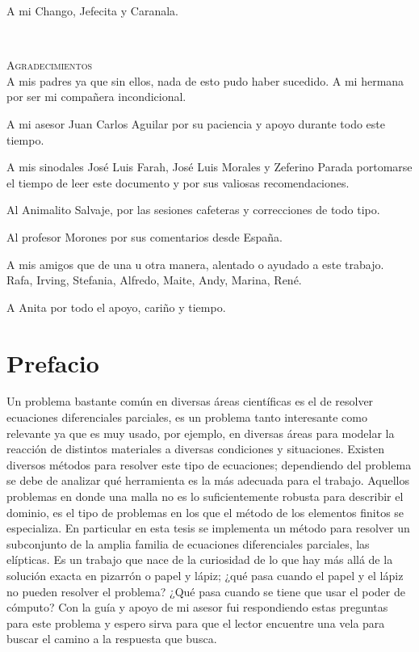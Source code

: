 \documentclass[12pt,spanish,oneside]{book}
\theoremstyle{plain}
\numberwithin{equation}{chapter}
\theoremstyle{definition}
\theoremstyle{remark}
\begin{document}
\newpage
\vspace*{\fill}
\begin{flushright}
A mi Chango, Jefecita y Caranala.
\vfill
\end{flushright}
\newpage
\mbox{ }
\vspace{80pt}
\begin{flushright}
\textsc{\large Agradecimientos} \\
\vspace{12pt}
A mis padres ya que sin ellos, nada de esto pudo haber sucedido. A mi hermana por ser mi compañera incondicional.

A mi asesor Juan Carlos Aguilar por su paciencia y apoyo durante todo este tiempo.

A mis sinodales José Luis Farah, José Luis Morales y Zeferino Parada portomarse el tiempo de leer este documento y por sus valiosas recomendaciones.

Al Animalito Salvaje, por las sesiones cafeteras y correcciones de todo tipo.

Al profesor Morones por sus comentarios desde España.

A mis amigos que de una u otra manera, alentado o ayudado a este trabajo. Rafa, Irving, Stefania, Alfredo, Maite, Andy, Marina, René.

A Anita por todo el apoyo, cariño y tiempo.


\end{flushright}

\chapter*{Prefacio}

Un problema bastante común en diversas áreas científicas es el de resolver ecuaciones diferenciales parciales, es un problema tanto interesante como relevante ya que es muy usado, por ejemplo, en diversas áreas para modelar la reacción de distintos materiales a diversas condiciones y situaciones. Existen diversos métodos para resolver este tipo de ecuaciones; dependiendo del problema se debe de analizar qué herramienta es la más adecuada para el trabajo. Aquellos problemas en donde una malla no es lo suficientemente robusta para describir el dominio, es el tipo de problemas en los que el método de los elementos finitos se especializa. En particular en esta tesis se implementa un método para resolver un subconjunto de la amplia familia de ecuaciones diferenciales parciales, las elípticas. Es un trabajo que nace de la curiosidad de lo que hay más allá de la solución exacta en pizarrón o papel y lápiz; ¿qué pasa cuando el papel y el lápiz no pueden resolver el problema? ¿Qué pasa cuando se tiene que usar el poder de cómputo? Con la guía y apoyo de mi asesor fui respondiendo estas preguntas para este problema y espero sirva para que el lector encuentre una vela para buscar el camino a la respuesta que busca. 
\end{document}
